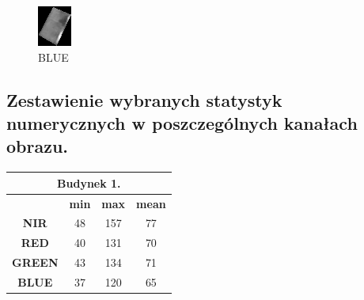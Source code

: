 \documentclass[a4paper,12pt]{article}  %
\begin{document}
\begin{figure}[H]
\begin{minipage}{0.24\textwidth}
        \includegraphics[width=\linewidth]{spektralne/blue_budynek3.png}
        \caption*{BLUE}
    \end{minipage}
\end{figure}

\newpage
\subsection{Zestawienie wybranych statystyk numerycznych w poszczególnych kanałach obrazu.}

\begin{table}[h!]
\centering
\begin{tabular}{|c|c|c|c|}
\hline
\multicolumn{4}{|c|}{\textbf{Budynek 1.}} \\ \hline
\textbf{} & \textbf{min} & \textbf{max} & \textbf{mean} \\ \hline
\textbf{NIR} & 48 & 157 & 77\\ \hline
\textbf{RED} & 40 & 131 & 70\\ \hline
\textbf{GREEN} & 43 & 134 & 71\\ \hline
\textbf{BLUE} & 37 & 120 & 65\\ \hline
\end{tabular}
\end{table}
\end{document}
